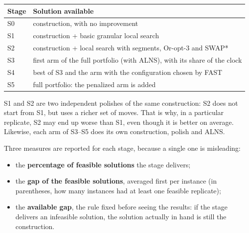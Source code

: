 \documentclass[11pt,a4paper]{article}
\begin{document}
\begin{center}
\small
\begin{tabular}{@{}ll@{}}
\toprule
Stage & Solution available \\
\midrule
S0 & construction, with no improvement \\
S1 & construction + basic granular local search \\
S2 & construction + local search with segments, Or-opt-3 and SWAP* \\
S3 & first arm of the full portfolio (with ALNS), with its share of the clock \\
S4 & best of S3 and the arm with the configuration chosen by FAST \\
S5 & full portfolio: the penalized arm is added \\
\bottomrule
\end{tabular}
\end{center}

\noindent S1 and S2 are two independent polishes of the same construction: S2 does not start from S1,
but uses a richer set of moves. That is why, in a particular replicate, S2 may end up worse than S1,
even though it is better on average. Likewise, each arm of S3--S5 does its own construction, polish
and ALNS.

Three measures are reported for each stage, because a single one is misleading:
\begin{itemize}[leftmargin=1.5em]
\item the \textbf{percentage of feasible solutions} the stage delivers;
\item the \textbf{gap of the feasible solutions}, averaged first per instance (in parentheses, how
many instances had at least one feasible replicate);
\item the \textbf{available gap}, the rule fixed before seeing the results: if the stage delivers an
infeasible solution, the solution actually in hand is still the construction.
\end{itemize}
\end{document}
